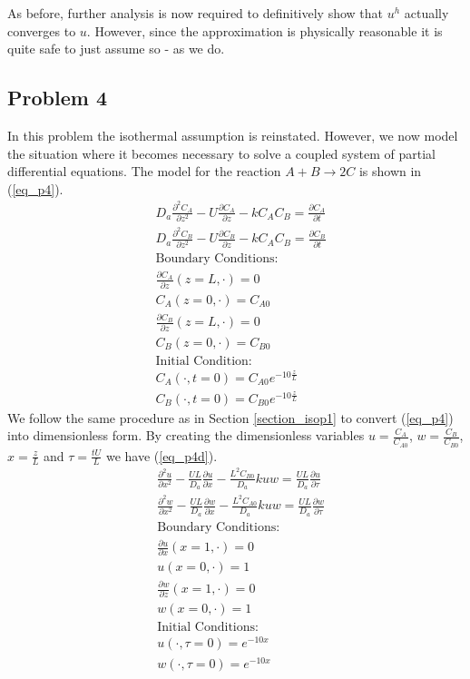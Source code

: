 \documentclass[11pt,fleqn]{article}
\theoremstyle{defstyle}
\begin{document}
As before, further analysis is now required to definitively show that $u^h$ actually converges to $u$. However, since the approximation is physically reasonable it is quite safe to just assume so - as we do.

\subsection{Problem 4}
In this problem the isothermal assumption is reinstated. However, we now model the situation where it becomes necessary to solve a coupled system of partial differential equations. The model for the reaction $A + B \rightarrow 2C$ is shown in (\ref{eq_p4}). 
\begin{equation}
\begin{aligned}
&D_a \frac{\partial^2 C_A}{\partial z^2} - U \frac{\partial C_A}{\partial z} - kC_AC_B 
= \frac{\partial C_A}{\partial t} \\
&D_a \frac{\partial^2 C_B}{\partial z^2} - U \frac{\partial C_B}{\partial z} - kC_AC_B 
= \frac{\partial C_B}{\partial t} \\
&\text{Boundary Conditions:} \\
&\frac{\partial C_A}{\partial z}(z=L, \cdot) = 0\\
&C_A(z=0, \cdot) = C_{A0} \\
&\frac{\partial C_B}{\partial z}(z=L, \cdot) = 0\\
&C_B(z=0, \cdot) = C_{B0} \\
&\text{Initial Condition:} \\
& C_A(\cdot, t= 0) = C_{A0}e^{-10\frac{z}{L}} \\
& C_B(\cdot, t= 0) = C_{B0}e^{-10\frac{z}{L}}
\end{aligned}
\label{eq_p4}
\end{equation}
We follow the same procedure as in Section \ref{section_isop1} to convert (\ref{eq_p4}) into dimensionless form. By creating the dimensionless variables $u=\frac{C_A}{C_{A0}}$, $w=\frac{C_B}{C_{B0}}$, $x = \frac{z}{L}$ and $\tau = \frac{tU}{L}$ we have (\ref{eq_p4d}).
\begin{equation}
\begin{aligned}
&\frac{\partial^2 u}{\partial x^2} - \frac{UL}{D_a} \frac{\partial u}{\partial x} - \frac{L^2C_{B0}}{D_a}kuw 
= \frac{UL}{D_a}\frac{\partial u}{\partial \tau} \\
&\frac{\partial^2 w}{\partial x^2} - \frac{UL}{D_a} \frac{\partial w}{\partial x} - \frac{L^2C_{A0}}{D_a}kuw 
= \frac{UL}{D_a}\frac{\partial w}{\partial \tau} \\
&\text{Boundary Conditions:} \\
&\frac{\partial u}{\partial x}(x=1, \cdot) = 0\\
&u(x=0, \cdot) = 1 \\
&\frac{\partial w}{\partial z}(x=1, \cdot) = 0\\
&w(x=0, \cdot) = 1 \\
&\text{Initial Conditions:} \\
& u(\cdot, \tau= 0) = e^{-10x} \\
& w(\cdot, \tau= 0) = e^{-10x}
\end{aligned}
\label{eq_p4d}
\end{equation}
\end{document}
